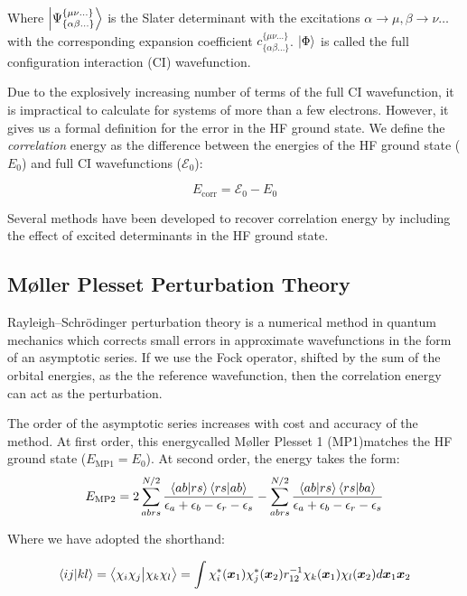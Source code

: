 Where $\ket{\Psi_{\{\alpha\beta\ldots\}}^{\{\mu\nu\ldots\}}}$ is the Slater determinant with the excitations $\alpha\rightarrow\mu, \beta\rightarrow\nu \ldots$ with the corresponding expansion coefficient $c_{\{\alpha\beta\ldots\}}^{\{\mu\nu\ldots\}}$. $\ket{\Phi}$ is called the full configuration interaction (CI) wavefunction.

Due to the explosively increasing number of terms of the full CI wavefunction, it is impractical to calculate for systems of more than a few electrons. However, it gives us a formal definition for the error in the HF ground state. We define the \textit{correlation} energy as the difference between the energies of the HF ground state ($E_0$) and full CI wavefunctions ($\mathcal{E}_0$):

\begin{equation}
    E_{\text{corr}} = \mathcal{E}_0 - E_0
\end{equation}

Several methods have been developed to recover correlation energy by including the effect of excited determinants in the HF ground state.

\subsection{M{\o}ller Plesset Perturbation Theory}
Rayleigh–Schr{\"o}dinger perturbation theory is a numerical method in quantum mechanics which corrects small errors in approximate wavefunctions in the form of an asymptotic series. If we use the Fock operator, shifted by the sum of the orbital energies, as the the reference wavefunction, then the correlation energy can act as the perturbation.\cite{Moller1934}

The order of the asymptotic series increases with cost and accuracy of the method. At first order, this energy\textemdash{}called M{\o}ller Plesset 1 (MP1)\textemdash{}matches the HF ground state ($E_{\text{MP1}} = E_{0}$). At second order, the energy takes the form:
\begin{equation}
    E_{\text{MP2}} = 2 \sum_{abrs}^{N/2} \frac{\bra{ab}\ket{rs} \bra{rs}\ket{ab}}{\epsilon_a + \epsilon_b - \epsilon_r - \epsilon_s} - \sum_{abrs}^{N/2} \frac{\bra{ab}\ket{rs} \bra{rs}\ket{ba}}{\epsilon_a + \epsilon_b - \epsilon_r - \epsilon_s}
\end{equation}

Where we have adopted the shorthand:

\begin{equation}
\braket{ij}{kl} = \braket{\chi_i\chi_j}{\chi_k\chi_l} = \int \chi^*_i(\bm{x}_1) \chi^*_j(\bm{x}_2) r^{-1}_{12} \chi_k(\bm{x}_1) \chi_l(\bm{x}_2) d\bm{x}_1\bm{x}_2
\end{equation}

